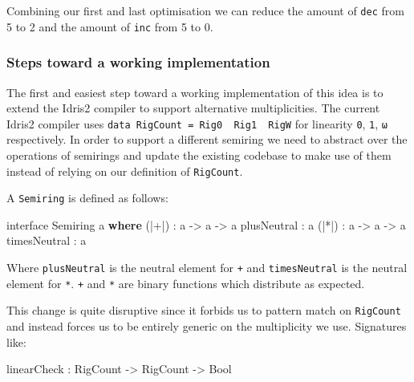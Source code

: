 \documentclass[
]{article}
\newenvironment{Shaded}{}{}
\newcommand{\DataTypeTok}[1]{\textcolor[rgb]{0.56,0.13,0.00}{#1}}
\newcommand{\KeywordTok}[1]{\textcolor[rgb]{0.00,0.44,0.13}{\textbf{#1}}}
\newcommand{\NormalTok}[1]{#1}
\newcommand{\OperatorTok}[1]{\textcolor[rgb]{0.40,0.40,0.40}{#1}}
\newcommand{\OtherTok}[1]{\textcolor[rgb]{0.00,0.44,0.13}{#1}}
\begin{document}
Combining our first and last optimisation we can reduce the amount of
\texttt{dec} from 5 to 2 and the amount of \texttt{inc} from 5 to 0.

\hypertarget{steps-toward-a-working-implementation}{%
\subsubsection{Steps toward a working
implementation}\label{steps-toward-a-working-implementation}}

The first and easiest step toward a working implementation of this idea
is to extend the Idris2 compiler to support alternative multiplicities.
The current Idris2 compiler uses
\texttt{data\ RigCount\ =\ Rig0\ \textbar{}\ Rig1\ \textbar{}\ RigW} for
linearity \texttt{0}, \texttt{1}, \texttt{ω} respectively. In order to
support a different semiring we need to abstract over the operations of
semirings and update the existing codebase to make use of them instead
of relying on our definition of \texttt{RigCount}.

A \texttt{Semiring} is defined as follows:

\begin{Shaded}
\begin{Highlighting}[]
\NormalTok{interface }\DataTypeTok{Semiring}\NormalTok{ a }\KeywordTok{where}
\NormalTok{  (}\OperatorTok{|+|}\NormalTok{) }\OperatorTok{:}\NormalTok{ a }\OtherTok{{-}\textgreater{}}\NormalTok{ a }\OtherTok{{-}\textgreater{}}\NormalTok{ a}
\NormalTok{  plusNeutral }\OperatorTok{:}\NormalTok{ a}
\NormalTok{  (}\OperatorTok{|*|}\NormalTok{) }\OperatorTok{:}\NormalTok{ a }\OtherTok{{-}\textgreater{}}\NormalTok{ a }\OtherTok{{-}\textgreater{}}\NormalTok{ a}
\NormalTok{  timesNeutral }\OperatorTok{:}\NormalTok{ a}
\end{Highlighting}
\end{Shaded}

Where \texttt{plusNeutral} is the neutral element for
\texttt{\textbar{}+\textbar{}} and \texttt{timesNeutral} is the neutral
element for \texttt{\textbar{}*\textbar{}}.
\texttt{\textbar{}+\textbar{}} and \texttt{\textbar{}*\textbar{}} are
binary functions which distribute as expected.

This change is quite disruptive since it forbids us to pattern match on
\texttt{RigCount} and instead forces us to be entirely generic on the
multiplicity we use. Signatures like:

\begin{Shaded}
\begin{Highlighting}[]
\NormalTok{linearCheck }\OperatorTok{:} \DataTypeTok{RigCount} \OtherTok{{-}\textgreater{}} \DataTypeTok{RigCount} \OtherTok{{-}\textgreater{}} \DataTypeTok{Bool}
\end{Highlighting}
\end{Shaded}
\end{document}
